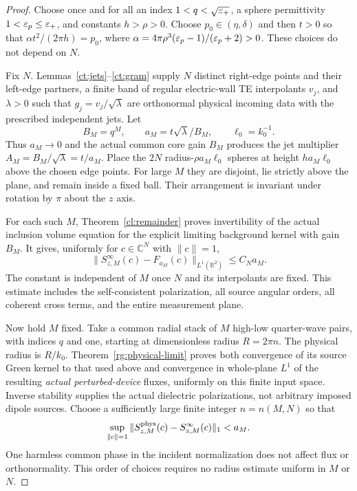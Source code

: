 \begin{proof}
Choose once and for all an index $1<q<\sqrt{\varepsilon_+}$, a sphere
permittivity $1<\varepsilon_p\leq\varepsilon_+$, and constants $h>\rho>0$.
Choose $p_0\in(\eta,\delta)$ and then $t>0$ so that
$\alpha t^2/(2\pi h)=p_0$, where
$\alpha=4\pi\rho^3(\varepsilon_p-1)/(\varepsilon_p+2)>0$.
These choices do not depend on $N$.

Fix $N$. Lemmas~\ref{ct:jets}--\ref{ct:gram} supply $N$ distinct
right-edge points and their left-edge partners, a finite band of
regular electric-wall TE interpolants $v_j$, and $\lambda>0$ such
that $g_j=v_j/\sqrt\lambda$ are orthonormal physical incoming data
with the prescribed independent jets. Let
\[
 B_M=q^M,\qquad a_M=t\sqrt\lambda/B_M,\qquad \ell_0=k_0^{-1}.
\]
Thus $a_M\to0$ and the actual common core gain $B_M$ produces the
jet multiplier $A_M=B_M/\sqrt\lambda=t/a_M$.
Place the $2N$ radius-$\rho a_M\ell_0$ spheres at height
$h a_M\ell_0$ above the chosen edge points. For large $M$ they are
disjoint, lie strictly above the plane, and remain inside a fixed
ball. Their arrangement is invariant under rotation by $\pi$ about
the $z$ axis.

For each such $M$, Theorem~\ref{cl:remainder} proves invertibility
of the actual inclusion volume equation for the explicit limiting
background kernel with gain $B_M$. It gives, uniformly for
$c\in\mathbb C^N$ with $\|c\|=1$,
\[
 \|S_{z,M}^{\infty}(c)-F_{a_M}(c)\|_{L^1(\mathbb R^2)}
       \leq C_N a_M.
\]
The constant is independent of $M$ once $N$ and its interpolants
are fixed. This estimate includes the self-consistent polarization,
all source angular orders, all coherent cross terms, and the entire
measurement plane.

Now hold $M$ fixed. Take a common radial stack of $M$ high-low
quarter-wave pairs, with indices $q$ and one, starting at
dimensionless radius $R=2\pi n$. The physical radius is $R/k_0$.
Theorem~\ref{rg:physical-limit} proves both convergence of its
source Green kernel to that used above and convergence in whole-plane
$L^1$ of the resulting \emph{actual perturbed-device} fluxes, uniformly
on this finite input space. Inverse stability supplies the actual
dielectric polarizations, not arbitrary imposed dipole sources.
Choose a sufficiently large finite integer $n=n(M,N)$ so that
\[
 \sup_{\|c\|=1}
 \|S_{z,M}^{\rm phys}(c)-S_{z,M}^{\infty}(c)\|_1<a_M.
\]
One harmless common phase in the incident normalization does not
affect flux or orthonormality. This order of choices requires no
radius estimate uniform in $M$ or $N$.


\end{proof}
